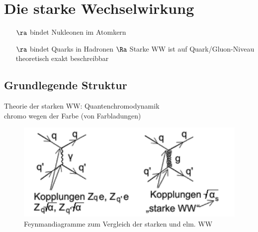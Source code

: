 \chapter{Die starke Wechselwirkung}
\begin{itemize}
\item[$\ra$]  bindet Nukleonen im Atomkern
\item[$\ra$] bindet Quarks in Hadronen
$\Ra$ Starke WW ist auf Quark/Gluon-Niveau theoretisch exakt beschreibbar
\end{itemize}
\section{Grundlegende Struktur}
Theorie der starken WW: Quantenchromodynamik\\
\glqq chromo\grqq{} wegen der Farbe (von Farbladungen)
\begin{figure}[!ht]
\centering
\includegraphics[width=.6\textwidth]{imgs/ep5-fig-7-1.pdf}
\caption{Feynmandiagramme zum Vergleich der starken und elm. WW \label{fig:7.1}}
\end{figure}
